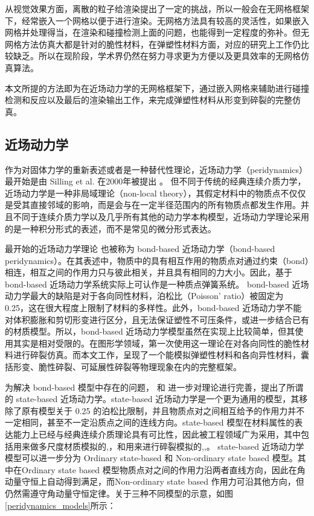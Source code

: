 从视觉效果方面，离散的粒子给渲染提出了一定的挑战，所以一般会在无网格框架下，经常嵌入一个网格以便于进行渲染。无网格方法具有较高的灵活性，如果嵌入网格并处理得当，在渲染和碰撞检测上面的问题，也能得到一定程度的弥补。但无网格方法仿真大都是针对的脆性材料，在弹塑性材料方面，对应的研究上工作仍比较缺乏。所以在现阶段，学术界仍然在努力寻求更为方便以及更具效率的无网格仿真算法。

本文所提的方法即为在近场动力学的无网格框架下，通过嵌入网格来辅助进行碰撞检测和反应以及最后的渲染输出工作，来完成弹塑性材料从形变到碎裂的完整仿真。

\subsection{近场动力学}
\label{pdm_history}

作为对固体力学的重新表述或者是一种替代性理论，近场动力学（peridynamics）最开始是由 Silling et al. 在2000年被提出 。 但不同于传统的经典连续介质力学，近场动力学是一种非局域理论（non-local theory），其假定材料中的物质点不仅仅是受其直接邻域的影响，而是会与在一定半径范围内的所有物质点都发生作用。并且不同于连续介质力学以及几乎所有其他的动力学本构模型，近场动力学理论采用的是一种积分形式的表述，而不是常见的微分形式表达。

最开始的近场动力学理论 也被称为 bond-based 近场动力学（bond-based peridynamics）。在其表述中，物质中的具有相互作用的物质点对通过约束（bond）相连，相互之间的作用力只与彼此相关，并且具有相同的力大小。因此，基于 bond-based 近场动力学系统实际上可认作是一种质点弹簧系统。 bond-based 近场动力学最大的缺陷是对于各向同性材料，泊松比（Poisson' ratio）被固定为 0.25，这在很大程度上限制了材料的多样性。此外，bond-based 近场动力学不能对体积膨胀和剪切形变进行区分，且无法保证塑性不可压条件，或进一步结合已有的材质模型。所以，bond-based 近场动力学模型虽然在实现上比较简单，但其使用其实是相对受限的。在图形学领域，第一次使用这一理论在对各向同性的脆性材料进行碎裂仿真。而本文工作，呈现了一个能模拟弹塑性材料和各向异性材料，囊括形变、脆性碎裂、可延展性碎裂等物理现象在内的完整框架。

为解决 bond-based 模型中存在的问题， 和 进一步对理论进行完善，提出了所谓的 state-based 近场动力学。state-based 近场动力学是一个更为通用的模型，其移除了原有模型关于 0.25 的泊松比限制，并且物质点对之间相互给予的作用力并不一定相同，甚至不一定沿质点之间的连线方向。state-based 模型在材料属性的表达能力上已经与经典连续介质理论具有可比性，因此被工程领域广为采用，其中包括用来做多尺度材质模拟的,，和用来进行碎裂模拟的,,。
state-based 近场动力学模型可以进一步分为 Ordinary state-based 和 Non-ordinary state based 模型。其中在Ordinary state based 模型物质点对之间的作用力沿两者直线方向，因此在角动量守恒上自动得到满足，而Non-ordinary state based 作用力可沿其他方向，但仍然需遵守角动量守恒定律。关于三种不同模型的示意，如图\ref{peridynamics_models}所示：

